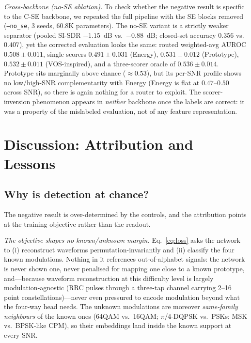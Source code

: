 \documentclass[review,12pt]{elsarticle}
\begin{document}
\emph{Cross-backbone (no-SE ablation).} To check whether the negative
result is specific to the C-SE backbone, we repeated the full pipeline
with the SE blocks removed (\texttt{--no\_se}, 3 seeds, 60.8K
parameters). The no-SE variant is a strictly weaker separator (pooled
SI-SDR $-1.15$~dB vs.\ $-0.88$~dB; closed-set accuracy $0.356$ vs.\
$0.407$), yet the corrected evaluation looks the same: routed
weighted-avg AUROC $0.508 \pm 0.011$, single scorers $0.491 \pm 0.031$
(Energy), $0.531 \pm 0.012$ (Prototype), $0.532 \pm 0.011$
(VOS-inspired), and a three-scorer oracle of $0.536 \pm 0.014$.
Prototype sits marginally above chance ($\approx 0.53$), but its
per-SNR profile shows no low/high-SNR complementarity with Energy
(Energy is flat at $0.47$--$0.50$ across SNR), so there is again
nothing for a router to exploit. The scorer-inversion phenomenon
appears in \emph{neither} backbone once the labels are correct: it was
a property of the mislabeled evaluation, not of any feature
representation.

\section{Discussion: Attribution and Lessons}
\label{sec:disc}

\subsection{Why is detection at chance?}

The negative result is over-determined by the controls, and the
attribution points at the training objective rather than the readout.

\emph{The objective shapes no known/unknown margin.}
Eq.~\eqref{eq:loss} asks the network to (i) reconstruct waveforms
permutation-invariantly and (ii) classify the four known modulations.
Nothing in it references out-of-alphabet signals: the network is never
shown one, never penalised for mapping one close to a known prototype,
and---because waveform reconstruction at this difficulty level is
largely modulation-agnostic (RRC pulses through a three-tap channel
carrying 2--16 point constellations)---never even pressured to encode
modulation beyond what the four-way head needs. The unknown
modulations are moreover \emph{same-family neighbours} of the known
ones (64QAM vs.\ 16QAM; $\pi$/4-DQPSK vs.\ PSKs; MSK vs.\ BPSK-like
CPM), so their embeddings land inside the known support at every SNR.
\end{document}
